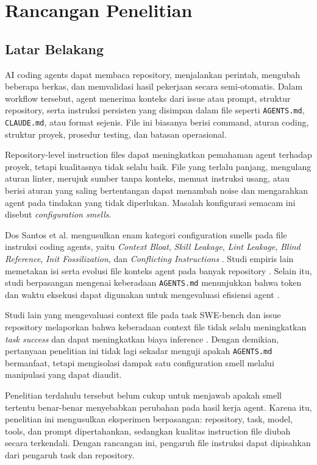 \chapter{Rancangan Penelitian}

\section{Latar Belakang}

AI coding agents dapat membaca repository, menjalankan perintah, mengubah beberapa berkas, dan memvalidasi hasil pekerjaan secara semi-otomatis. Dalam workflow tersebut, agent menerima konteks dari issue atau prompt, struktur repository, serta instruksi persisten yang disimpan dalam file seperti \texttt{AGENTS.md}, \texttt{CLAUDE.md}, atau format sejenis. File ini biasanya berisi command, aturan coding, struktur proyek, prosedur testing, dan batasan operasional.

Repository-level instruction files dapat meningkatkan pemahaman agent terhadap proyek, tetapi kualitasnya tidak selalu baik. File yang terlalu panjang, mengulang aturan linter, merujuk sumber tanpa konteks, memuat instruksi usang, atau berisi aturan yang saling bertentangan dapat menambah noise dan mengarahkan agent pada tindakan yang tidak diperlukan. Masalah konfigurasi semacam ini disebut \textit{configuration smells}.

Dos Santos et al. mengusulkan enam kategori configuration smells pada file instruksi coding agents, yaitu \textit{Context Bloat}, \textit{Skill Leakage}, \textit{Lint Leakage}, \textit{Blind Reference}, \textit{Init Fossilization}, dan \textit{Conflicting Instructions} \cite{configsmells2026}. Studi empiris lain memetakan isi serta evolusi file konteks agent pada banyak repository \cite{agentreadmes2025}. Selain itu, studi berpasangan mengenai keberadaan \texttt{AGENTS.md} menunjukkan bahwa token dan waktu eksekusi dapat digunakan untuk mengevaluasi efisiensi agent \cite{lulla2026agents}.

Studi lain yang mengevaluasi context file pada task SWE-bench dan issue repository melaporkan bahwa keberadaan context file tidak selalu meningkatkan \textit{task success} dan dapat meningkatkan biaya inference \cite{gloaguen2026agents}. Dengan demikian, pertanyaan penelitian ini tidak lagi sekadar menguji apakah \texttt{AGENTS.md} bermanfaat, tetapi mengisolasi dampak satu configuration smell melalui manipulasi yang dapat diaudit.

Penelitian terdahulu tersebut belum cukup untuk menjawab apakah smell tertentu benar-benar menyebabkan perubahan pada hasil kerja agent. Karena itu, penelitian ini mengusulkan eksperimen berpasangan: repository, task, model, tools, dan prompt dipertahankan, sedangkan kualitas instruction file diubah secara terkendali. Dengan rancangan ini, pengaruh file instruksi dapat dipisahkan dari pengaruh task dan repository.

